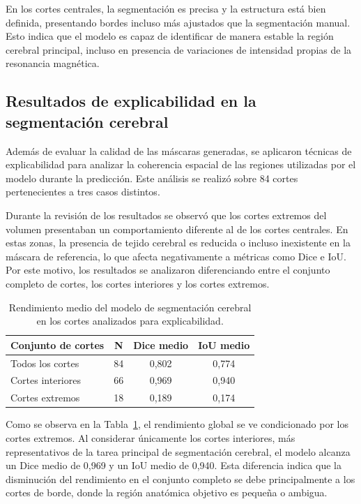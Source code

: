 En los cortes centrales, la segmentación es precisa y la estructura está bien definida, presentando bordes incluso más ajustados que la segmentación manual. Esto indica que el modelo es capaz de identificar de manera estable la región cerebral principal, incluso en presencia de variaciones de intensidad propias de la resonancia magnética.

\subsection{Resultados de explicabilidad en la segmentación cerebral}

Además de evaluar la calidad de las máscaras generadas, se aplicaron técnicas de explicabilidad para analizar la coherencia espacial de las regiones utilizadas por el modelo durante la predicción. Este análisis se realizó sobre 84 cortes pertenecientes a tres casos distintos.

Durante la revisión de los resultados se observó que los cortes extremos del volumen presentaban un comportamiento diferente al de los cortes centrales. En estas zonas, la presencia de tejido cerebral es reducida o incluso inexistente en la máscara de referencia, lo que afecta negativamente a métricas como Dice e IoU. Por este motivo, los resultados se analizaron diferenciando entre el conjunto completo de cortes, los cortes interiores y los cortes extremos.

\begin{table}[h]
\centering
\caption{Rendimiento medio del modelo de segmentación cerebral en los cortes analizados para explicabilidad.}
\label{tab:rendimiento_xai_cerebro}
\begin{tabular}{lccc}
\toprule
\textbf{Conjunto de cortes} & \textbf{N} & \textbf{Dice medio} & \textbf{IoU medio} \\
\midrule
Todos los cortes & 84 & 0,802 & 0,774 \\
Cortes interiores & 66 & 0,969 & 0,940 \\
Cortes extremos & 18 & 0,189 & 0,174 \\
\bottomrule
\end{tabular}
\end{table}

Como se observa en la Tabla~\ref{tab:rendimiento_xai_cerebro}, el rendimiento global se ve condicionado por los cortes extremos. Al considerar únicamente los cortes interiores, más representativos de la tarea principal de segmentación cerebral, el modelo alcanza un Dice medio de 0,969 y un IoU medio de 0,940. Esta diferencia indica que la disminución del rendimiento en el conjunto completo se debe principalmente a los cortes de borde, donde la región anatómica objetivo es pequeña o ambigua.

